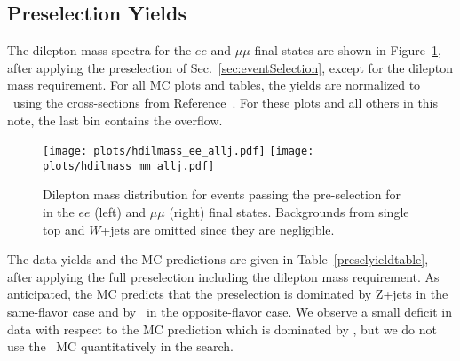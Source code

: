 \clearpage

\subsection{Preselection Yields}
\label{sec:yields}

The  dilepton mass spectra for the $ee$ and $\mu\mu$ final states are shown in 
Figure~\ref{fig:dilmass}, after applying the preselection of Sec.~\ref{sec:eventSelection}, except for the dilepton mass requirement.
For all MC plots and tables, the yields are normalized to \lumi\ using the cross-sections
from Reference~\cite{ref:xsec}.
For these plots and all others in this note, the last bin contains the overflow.


\begin{figure}[hbt]
  \begin{center}
	\texttt{[image: plots/hdilmass\_ee\_allj.pdf]}
	\texttt{[image: plots/hdilmass\_mm\_allj.pdf]}
	\caption{
	  \label{fig:dilmass}\protect 
	  Dilepton mass distribution for events passing the pre-selection for \lumi~
	  in the $ee$ (left) and $\mu\mu$ (right) final states. Backgrounds from 
	  single top and $W$+jets are omitted
	  since they are negligible.}
  \end{center}
\end{figure}


The data yields and the MC predictions are given in Table~\ref{preselyieldtable}, after applying
the full preselection including the dilepton mass requirement.
As anticipated, the MC predicts that the preselection is dominated by Z+jets in the same-flavor 
case and by \ttbar\ in the opposite-flavor case. We observe a small deficit %
in data
with respect to the MC prediction which is dominated by \zjets, but we do not use the \zjets\ MC quantitatively in the search.



